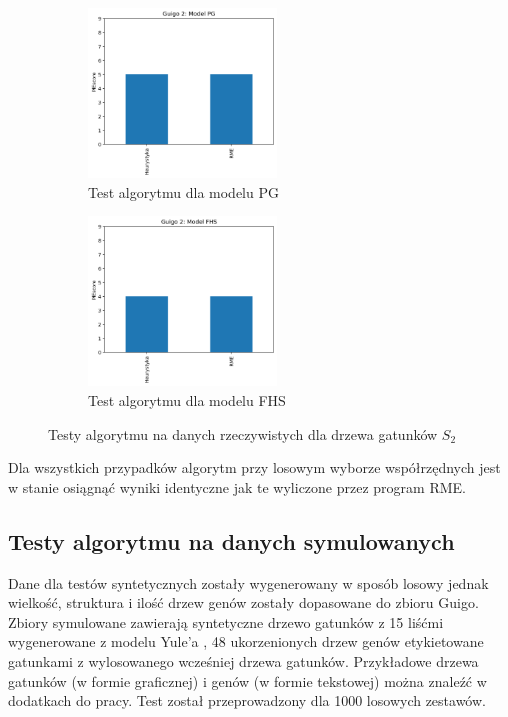 \documentclass[licencjacka]{pracamgr}
\begin{document}
\begin{figure}[H]
\centering
\begin{subfigure}{.5\textwidth}
  \centering
  \includegraphics[width=50mm]{./pictures/G2_PG.png}
  \caption{Test algorytmu dla modelu PG}
\end{subfigure}%
\begin{subfigure}{.5\textwidth}
  \centering
  \includegraphics[width=50mm]{./pictures/G2_FHS.png}
  \caption{Test algorytmu dla modelu FHS}
\end{subfigure}%
\caption{Testy algorytmu na danych rzeczywistych dla drzewa gatunków $S_2$}
\end{figure}

Dla wszystkich przypadków algorytm przy losowym wyborze współrzędnych jest w stanie osiągnąć wyniki identyczne jak te wyliczone przez program RME. 

\subsection{Testy algorytmu na danych symulowanych}
Dane dla testów syntetycznych zostały wygenerowany w sposób losowy jednak wielkość, struktura i ilość drzew genów zostały dopasowane do zbioru Guigo. Zbiory symulowane zawierają syntetyczne drzewo gatunków z 15 liśćmi wygenerowane z modelu Yule'a \cite{pmid11259805}, 48 ukorzenionych drzew genów etykietowane gatunkami z wylosowanego wcześniej drzewa gatunków. Przykładowe drzewa gatunków (w formie graficznej) i genów (w formie tekstowej) można znaleźć w dodatkach do pracy. Test został przeprowadzony dla 1000 losowych zestawów.
\end{document}
